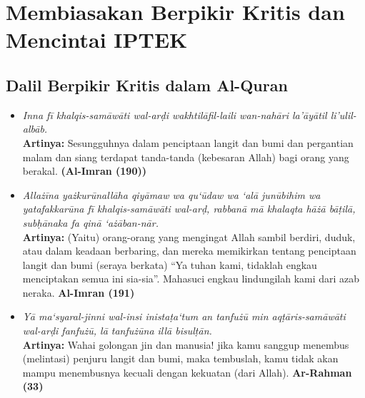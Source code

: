 \section{Membiasakan Berpikir Kritis dan Mencintai IPTEK}

\subsection{Dalil Berpikir Kritis dalam Al-Quran}

\begin{itemize}
\item \textit{Inna fī khalqis-samāwāti wal-arḍi wakhtilāfil-laili wan-nahāri la'āyātil li'ulil-albāb.} \\
  \textbf{Artinya: }Sesungguhnya dalam penciptaan langit dan bumi dan pergantian malam dan siang terdapat tanda-tanda (kebesaran Allah) bagi orang yang berakal. \textbf{(Al-Imran (190))}
  
\item \textit{Allażīna yażkurūnallāha qiyāmaw wa qu‘ūdaw wa ‘alā junūbihim wa yatafakkarūna fī khalqis-samāwāti wal-arḍ, rabbanā mā khalaqta hāżā bāṭilā, subḥānaka fa qinā ‘ażāban-nār.} \\
  \textbf{Artinya: }(Yaitu) orang-orang yang mengingat Allah sambil berdiri, duduk, atau dalam keadaan berbaring, dan mereka memikirkan tentang penciptaan langit dan bumi (seraya berkata) ``Ya tuhan kami, tidaklah engkau menciptakan semua ini sia-sia''. Mahasuci engkau lindungilah kami dari azab neraka. \textbf{Al-Imran (191)}

\item \textit{Yā ma‘syaral-jinni wal-insi inistaṭa‘tum an tanfużū min aqṭāris-samāwāti wal-arḍi fanfużū, lā tanfużūna illā bisulṭān.} \\
  \textbf{Artinya: }Wahai golongan jin dan manusia! jika kamu sanggup menembus (melintasi) penjuru langit dan bumi, maka tembuslah, kamu tidak akan mampu menembusnya kecuali dengan kekuatan (dari Allah). \textbf{Ar-Rahman (33)}
\end{itemize}

